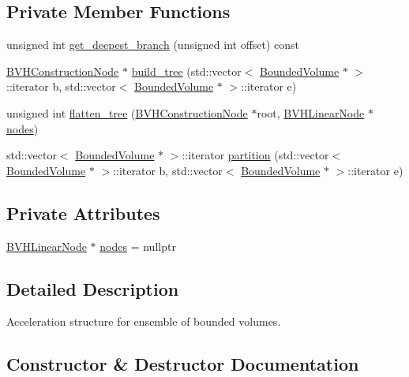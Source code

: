 \subsection*{Private Member Functions}
\begin{DoxyCompactItemize}
\item 
unsigned int \hyperlink{classBinaryVolumeHierarchy_aee9070a784292e5a5f6897a1dde2f9fc}{get\+\_\+deepest\+\_\+branch} (unsigned int offset) const 
\item 
\hyperlink{structBVHConstructionNode}{B\+V\+H\+Construction\+Node} $\ast$ \hyperlink{classBinaryVolumeHierarchy_aa9c190d6301f6fe7ba5b9c77d9517ec4}{build\+\_\+tree} (std\+::vector$<$ \hyperlink{classBoundedVolume}{Bounded\+Volume} $\ast$ $>$\+::iterator b, std\+::vector$<$ \hyperlink{classBoundedVolume}{Bounded\+Volume} $\ast$ $>$\+::iterator e)
\item 
unsigned int \hyperlink{classBinaryVolumeHierarchy_a975a30c71deb503c9f64248b8f14c8cf}{flatten\+\_\+tree} (\hyperlink{structBVHConstructionNode}{B\+V\+H\+Construction\+Node} $\ast$root, \hyperlink{structBVHLinearNode}{B\+V\+H\+Linear\+Node} $\ast$\hyperlink{classBinaryVolumeHierarchy_abbadac5cecbdedd8df30cd294ff0ed29}{nodes})
\item 
std\+::vector$<$ \hyperlink{classBoundedVolume}{Bounded\+Volume} $\ast$ $>$\+::iterator \hyperlink{classBinaryVolumeHierarchy_ab30dec4aa6ef808f53bbdedb98d8af65}{partition} (std\+::vector$<$ \hyperlink{classBoundedVolume}{Bounded\+Volume} $\ast$ $>$\+::iterator b, std\+::vector$<$ \hyperlink{classBoundedVolume}{Bounded\+Volume} $\ast$ $>$\+::iterator e)
\end{DoxyCompactItemize}
\subsection*{Private Attributes}
\begin{DoxyCompactItemize}
\item 
\hyperlink{structBVHLinearNode}{B\+V\+H\+Linear\+Node} $\ast$ \hyperlink{classBinaryVolumeHierarchy_abbadac5cecbdedd8df30cd294ff0ed29}{nodes} = nullptr
\end{DoxyCompactItemize}


\subsection{Detailed Description}
Acceleration structure for ensemble of bounded volumes. 

\subsection{Constructor \& Destructor Documentation}
